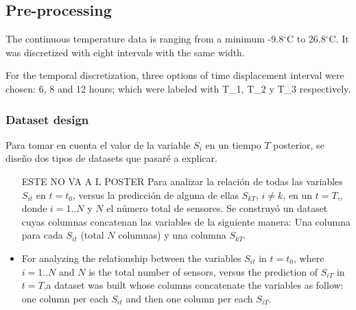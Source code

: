 \documentclass[final,a4paper]{llncs}
\newcommand{\degree}{$^{\circ}$}
\begin{document}
\subsection{Pre-processing}\label{preproc}


The continuous temperature data is ranging from a minimum -9.8\degree C to 26.8\degree C.
It was discretized with eight intervals with the same width.
 
For the temporal discretization, three options of time displacement interval were chosen:
6, 8 and 12 hours; which were labeled with  T\_1, T\_2 y T\_3 respectively.

%
%

\subsubsection{Dataset design}

Para tomar en cuenta el valor de la variable $S_{i}$
en un tiempo $T$ posterior, se diseño dos tipos de datasets que pasaré a explicar.


\begin{itemize}

\item [ESTE NO VA A L POSTER] Para analizar la relación de todas las variables $S_{it}$ en $t=t_{0}$,
 versus la predicción de alguna de ellas $S_{kT}$, $i \neq k$, en un $t=T$,, 
donde $i=1..N$ y $N$ el número total de sensores.
Se construyó un dataset cuyas columnas concatenan las variables de la siguiente manera:
Una columna para cada $S_{it}$ (total $N$ columnas) y una columna $S_{kT}$.

\item For analyzing the relationship between the variables $S_{it}$ in $t=t_{0}$, where $i=1..N$ and 
 $N$ is the total number of sensors, versus the prediction of $S_{iT}$ in $t=T$,a dataset was built whose
columns concatenate the variables as follow: one column per each $S_{it}$  and then 
one column per each $S_{iT}$.

\end{itemize}
\end{document}
